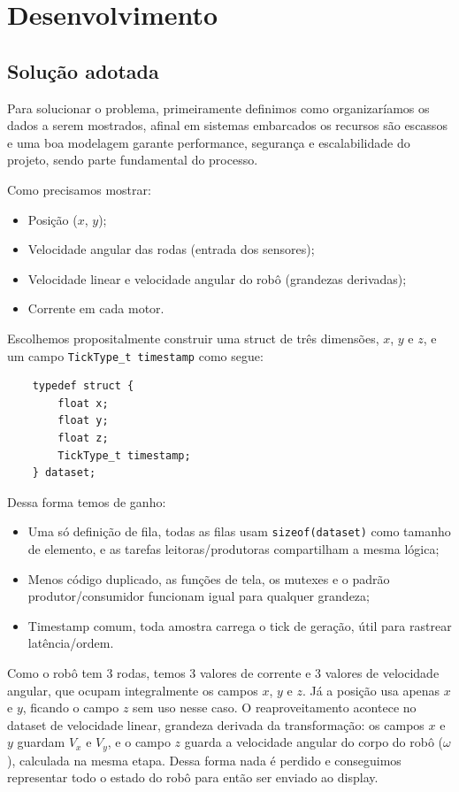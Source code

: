 \documentclass[a4paper,10pt]{article}
\begin{document}
\section{Desenvolvimento}

\subsection{Solução adotada}

Para solucionar o problema, primeiramente definimos como organizaríamos os dados a serem mostrados, afinal em sistemas embarcados os recursos são escassos e uma boa modelagem garante performance, segurança e escalabilidade do projeto, sendo parte fundamental do processo.

Como precisamos mostrar:
\begin{itemize}
    \item Posição ($x$, $y$);
    \item Velocidade angular das rodas (entrada dos sensores);
    \item Velocidade linear e velocidade angular do robô (grandezas derivadas);
    \item Corrente em cada motor.
\end{itemize}

Escolhemos propositalmente construir uma struct de três dimensões, $x$, $y$ e $z$, e um campo \texttt{TickType\_t timestamp} como segue:

\begin{verbatim}
    typedef struct {
        float x;
        float y;
        float z;
        TickType_t timestamp;
    } dataset;
\end{verbatim}

Dessa forma temos de ganho:
\begin{itemize}
    \item Uma só definição de fila, todas as filas usam \texttt{sizeof(dataset)} como tamanho de elemento, e as tarefas leitoras/produtoras compartilham a mesma lógica;
    \item Menos código duplicado, as funções de tela, os mutexes e o padrão produtor/consumidor funcionam igual para qualquer grandeza;
    \item Timestamp comum, toda amostra carrega o tick de geração, útil para rastrear latência/ordem.
\end{itemize}

Como o robô tem 3 rodas, temos 3 valores de corrente e 3 valores de velocidade angular, que ocupam integralmente os campos $x$, $y$ e $z$. Já a posição usa apenas $x$ e $y$, ficando o campo $z$ sem uso nesse caso. O reaproveitamento acontece no dataset de velocidade linear, grandeza derivada da transformação: os campos $x$ e $y$ guardam $V_x$ e $V_y$, e o campo $z$ guarda a velocidade angular do corpo do robô ($\omega$), calculada na mesma etapa. Dessa forma nada é perdido e conseguimos representar todo o estado do robô para então ser enviado ao display.
\end{document}
